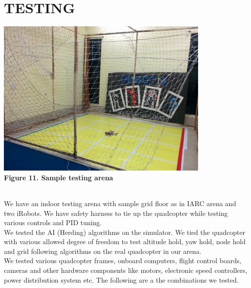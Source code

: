 \documentclass[12pt]{article}
\begin{document}
\section{TESTING}
\begin{center}\includegraphics[scale=0.7]{ARK-lab-kgp1} \\
\textbf{Figure 11. Sample testing arena}\end{center}\\
We have an indoor testing arena with sample grid floor as in IARC arena and two iRobots. We have safety harness to 
tie up the quadcopter while testing various controls and PID tuning. \\
We tested the AI (Herding) algorithms on the simulator. We tied the quadcopter with various allowed degree of 
freedom to test altitude hold, yaw hold, node hold and grid following algorithms on the real quadcopter in our arena.
\\
We tested various quadcopter frames, onboard computers, flight control boards, cameras and other hardware components 
like motors, electronic speed controllers, power distribution system etc. The following are a the combinations we tested.
\\
\end{document}
